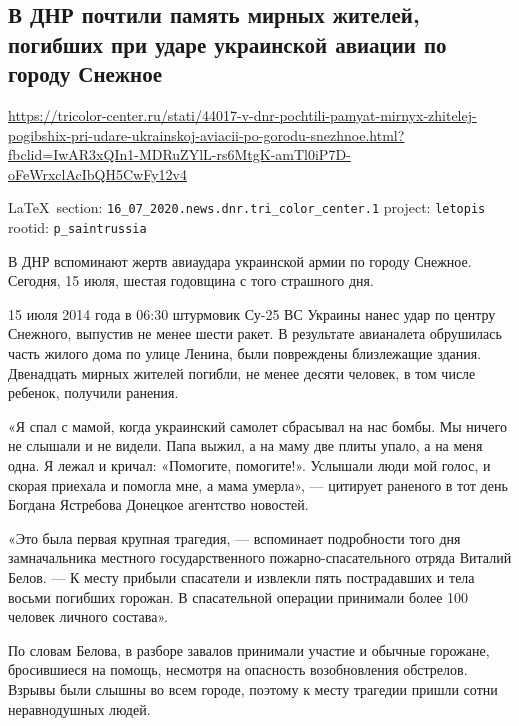  
 

\def\sectitle{В ДНР почтили память мирных жителей, погибших при ударе
украинской авиации по городу Снежное}

\subsection{\sectitle}
\url{https://tricolor-center.ru/stati/44017-v-dnr-pochtili-pamyat-mirnyx-zhitelej-pogibshix-pri-udare-ukrainskoj-aviacii-po-gorodu-snezhnoe.html?fbclid=IwAR3xQIn1-MDRuZYlL-rs6MtgK-amTl0iP7D-oFeWrxclAcIbQH5CwFy12v4}
  
\vspace{0.5cm}
{\ifDEBUG\small\LaTeX~section: \verb|16_07_2020.news.dnr.tri_color_center.1| project: \verb|letopis| rootid: \verb|p_saintrussia|\fi}
\vspace{0.5cm}

В ДНР вспоминают жертв авиаудара украинской армии по городу Снежное. Сегодня,
15 июля, шестая годовщина с того страшного дня.

15 июля 2014 года в 06:30 штурмовик Су-25 ВС Украины нанес удар по центру
Снежного, выпустив не менее шести ракет. В результате авианалета обрушилась
часть жилого дома по улице Ленина, были повреждены близлежащие здания.
Двенадцать мирных жителей погибли, не менее десяти человек, в том числе
ребенок, получили ранения.

«Я спал с мамой, когда украинский самолет сбрасывал на нас бомбы. Мы ничего не
слышали и не видели. Папа выжил, а на маму две плиты упало, а на меня одна. Я
лежал и кричал: «Помогите, помогите!». Услышали люди мой голос, и скорая
приехала и помогла мне, а мама умерла», — цитирует раненого в тот день Богдана
Ястребова Донецкое агентство новостей.

«Это была первая крупная трагедия, — вспоминает подробности того дня
замначальника местного государственного пожарно-спасательного отряда Виталий
Белов. — К месту прибыли спасатели и извлекли пять пострадавших и тела восьми
погибших горожан. В спасательной операции принимали более 100 человек личного
состава».

По словам Белова, в разборе завалов принимали участие и обычные горожане,
бросившиеся на помощь, несмотря на опасность возобновления обстрелов. Взрывы
были слышны во всем городе, поэтому к месту трагедии пришли сотни неравнодушных
людей.

